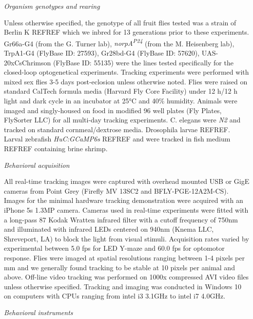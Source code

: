 \documentclass[10pt]{article}
\begin{document}
\begin{multicols}{2}
\vspace*{0.5cm}
\noindent\textit{Organism genotypes and rearing}
\vspace*{0.3cm}

Unless otherwise specified, the genotype of all fruit flies tested was a strain of Berlin K REFREF which we inbred for 13 generations prior to these experiments. Gr66a-G4 (from the G. Turner lab), \textit{norpA\textsuperscript{P24}} (from the M. Heisenberg lab), TrpA1-G4 (FlyBase ID: 27593), Gr28bd-G4 (FlyBase ID: 57620), UAS-20xCsChrimson (FlyBase ID: 55135) were the lines tested specifically for the closed-loop optogenetical experiments.  Tracking experiments were performed with mixed sex flies 3-5 days post-eclosion unless otherwise noted. Flies were raised on standard CalTech formula media (Harvard Fly Core Facility) under 12 h/12 h light and dark cycle in an incubator at 25°C and 40\% humidity. Animals were imaged and singly-housed on food in modified 96 well plates (Fly Plates, FlySorter LLC) for all multi-day tracking experiments. C. elegans were \textit{N2} and tracked on standard cornmeal/dextrose media. Drosophila larvae REFREF. Larval zebrafish \textit{HuC:GCaMP6s} REFREF and were tracked in fish medium REFREF containing brine shrimp.

\vspace*{0.5cm}
\noindent\textit{Behavioral acquisition}
\vspace*{0.3cm}

All real-time tracking images were captured with overhead mounted USB or GigE cameras from Point Grey (Firefly MV 13SC2 and BFLY-PGE-12A2M-CS). Images for the minimal hardware tracking demonstration were acquired with an iPhone 5s 1.3MP camera. Cameras used in real-time experiments were fitted with a long-pass 87 Kodak Wratten infrared filter with a cutoff frequency of 750nm and illuminated with infrared LEDs centered on 940nm (Knema LLC, Shreveport, LA) to block the light from visual stimuli. Acquisition rates varied by experimental between 5.0 fps for LED Y-maze and 60.0 fps for optomotor response. Flies were imaged at spatial resolutions ranging between 1-4 pixels per mm and we generally found tracking to be stable at 10 pixels per animal and above.  Off-line video tracking was performed on 1000x compressed AVI video files unless otherwise specified. Tracking and imaging was conducted in Windows 10 on computers with CPUs ranging from intel i3 3.1GHz to intel i7 4.0GHz. 

\vspace*{0.5cm}
\noindent\textit{Behavioral instruments}
\vspace*{0.3cm}


\end{multicols}
\end{document}
